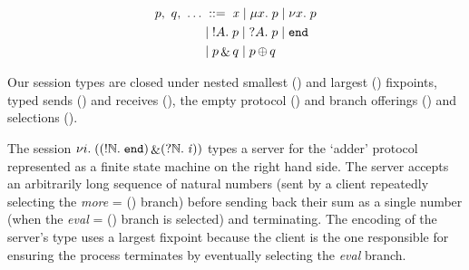 \documentclass{easychair}
\begin{document}
\noindent
\begin{wrapfigure}[25]{r}{.38\textwidth}\centering%
  \vspace{-1cm}%
  \begin{align*}%
  p,~ q,~ \dots &
    \; ::= \; \recvar{x}
    \; | \; \smallest{x}{p}
    \; | \; \largest{x}{p} \\
    &
    \; | \; \send{A}{p}
    \; | \; \recv{A}{p}
    \; | \; \stopsesh{} \\
    &
    \; | \; \offer{p}{q}
    \; | \; \select{p}{q}
  \end{align*}

  \vspace{.4cm}


  \vspace{.4cm}

\end{wrapfigure}
%
Our session types are closed under
nested smallest () and largest () fixpoints,
typed sends () and receives (),
the empty protocol (\stopsesh{})
and branch offerings (\offer{\cdot}{\cdot}) and selections (\select{\cdot}{\cdot}).

The session
$
\nu i.\;((!\mathbb{N}.\;\mathtt{end}) \mathop{\&} (?\mathbb{N}.\;\mathit{i}))
$
types a server for the `adder' protocol represented as
a finite state machine on the right hand side.
%
The server accepts an arbitrarily long sequence of natural numbers
(sent by a client repeatedly selecting the
\emph{more} = () branch)
before sending back their sum as a single number
(when the \emph{eval} = (\send{\nat}{\stopsesh}) branch is selected)
and terminating.
%
The encoding of the server's type uses a largest fixpoint
because the client is the one responsible
for ensuring the process terminates by eventually selecting
the \emph{eval} branch.
\end{document}
